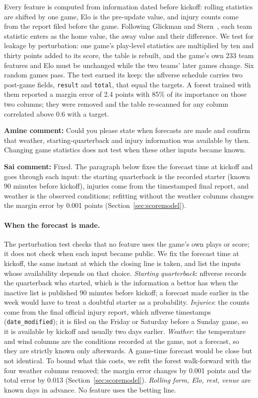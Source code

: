 \documentclass[11pt]{article}
\begin{document}
Every feature is computed from information dated before kickoff: rolling statistics are shifted by one game, Elo is the pre-update value, and injury counts come from the report filed before the game. Following Glickman and Stern~\cite{glickmanstern2017}, each team statistic enters as the home value, the away value and their difference. We test for leakage by perturbation: one game's play-level statistics are multiplied by ten and thirty points added to its score, the table is rebuilt, and the game's own 233 team features and Elo must be unchanged while the two teams' later games change. Six random games pass. The test earned its keep: the nflverse schedule carries two post-game fields, \texttt{result} and \texttt{total}, that equal the targets. A forest trained with them reported a margin error of 2.4 points with 85\% of its importance on those two columns; they were removed and the table re-scanned for any column correlated above 0.6 with a target.

{\color{red}\textbf{Amine comment:} Could you please state when forecasts are made and confirm that weather, starting-quarterback and injury information was available by then. Changing game statistics does not test when these other inputs became known.}

{\color{blue}\textbf{Sai comment:} Fixed. The paragraph below fixes the forecast time at kickoff and goes through each input: the starting quarterback is the recorded starter (known 90 minutes before kickoff), injuries come from the timestamped final report, and weather is the observed conditions; refitting without the weather columns changes the margin error by 0.001 points (Section~\ref{sec:scoremodel}).}

\paragraph{When the forecast is made.} The perturbation test checks that no feature uses the game's own plays or score; it does not check when each input became public. We fix the forecast time at kickoff, the same instant at which the closing line is taken, and list the inputs whose availability depends on that choice. \emph{Starting quarterback}: nflverse records the quarterback who started, which is the information a bettor has when the inactive list is published 90 minutes before kickoff; a forecast made earlier in the week would have to treat a doubtful starter as a probability. \emph{Injuries}: the counts come from the final official injury report, which nflverse timestamps (\texttt{date\_modified}); it is filed on the Friday or Saturday before a Sunday game, so it is available by kickoff and usually two days earlier. \emph{Weather}: the temperature and wind columns are the conditions recorded at the game, not a forecast, so they are strictly known only afterwards. A game-time forecast would be close but not identical. To bound what this costs, we refit the forest walk-forward with the four weather columns removed; the margin error changes by 0.001 points and the total error by 0.013 (Section~\ref{sec:scoremodel}). \emph{Rolling form, Elo, rest, venue} are known days in advance. No feature uses the betting line.
\end{document}
